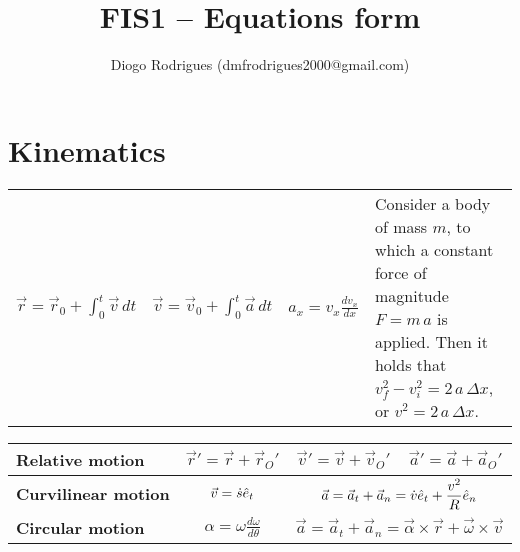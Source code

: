 \documentclass{form}
\author{Diogo Rodrigues (dmfrodrigues2000@gmail.com)}
\title{FIS1 -- Equations form}
\begin{document}
\section*{Kinematics}
\begin{center} \begin{tabular}{c | c | c | p{115mm}}
    $\displaystyle \vec{r} = \vec{r}_0 + \int_0^t{\vec{v}\,dt}$ &
    $\displaystyle \vec{v} = \vec{v}_0 + \int_0^t{\vec{a}\,dt}$ &
    $\displaystyle a_x = v_x \frac{dv_x}{dx}$ &
    Consider a body of mass $m$, to which a constant force of magnitude $F=m\,a$ is applied. Then it holds that $v_f^2 - v_i^2 = 2\,a\,\Delta x$, or $v^2 = 2\,a\,\Delta x$.
\end{tabular} \end{center}

\begin{center}
    \setlength\extrarowheight{9pt}
    \begin{tabular}{l | c | c | c}
        \textbf{Relative motion} & $\vec{r}' = \vec{r} + \vec{r}_O'$ & $\vec{v}' = \vec{v} + \vec{v}_O'$ & $\vec{a}' = \vec{a} + \vec{a}_O'$ \\[7pt] \hline
        \textbf{Curvilinear motion} & $\vec{v} = \dot{s} \hat{e}_t$ & \multicolumn{2}{c}{$\displaystyle \vec{a} = \vec{a}_t + \vec{a}_n = \dot{v} \hat{e}_t+\frac{v^2}{R}\hat{e}_n$} \\[7pt] \hline
        \textbf{Circular motion} & $\displaystyle \alpha = \omega \frac{d\omega}{d\theta}$ & \multicolumn{2}{c}{$\vec{a} = \vec{a}_t + \vec{a}_n = \vec{\alpha} \times \vec{r} + \vec{\omega} \times \vec{v}$} \\[7pt]
    \end{tabular}
\end{center}
\end{document}
